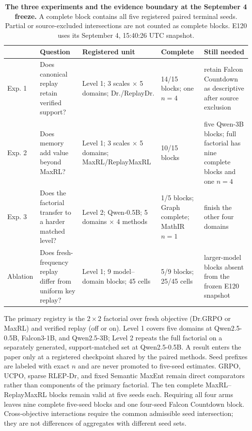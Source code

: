 \begin{table}[H]
  \centering
  \caption{\textbf{The three experiments and the evidence boundary at the
  September 4 freeze.} A complete block contains all five registered paired
  terminal seeds. Partial or source-excluded intersections are not counted as complete blocks.
  E120 uses its September 4, 15:40:26 UTC snapshot.}
  \label{tab:experiment-map}
  \scriptsize
  \setlength{\tabcolsep}{3pt}
  \begin{tabularx}{\linewidth}{@{}P{.09\linewidth}P{.27\linewidth}P{.25\linewidth}P{.15\linewidth}Y@{}}
    \toprule
    & \textbf{Question} & \textbf{Registered unit} & \textbf{Complete} &
      \textbf{Still needed} \\
    \midrule
    Exp. 1 & Does canonical replay retain verified support? &
      Level 1; 3 scales $\times$ 5 domains; Dr./ReplayDr. &
      14/15 blocks; one $n=4$ & retain Falcon Countdown as descriptive after source exclusion \\
    Exp. 2 & Does memory add value beyond MaxRL? &
      Level 1; 3 scales $\times$ 5 domains; MaxRL/ReplayMaxRL &
      10/15 blocks & five Qwen-3B blocks; full factorial has nine complete blocks and one $n=4$ \\
    Exp. 3 & Does the factorial transfer to a harder matched level? &
      Level 2; Qwen-0.5B; 5 domains $\times$ 4 methods &
      1/5 blocks; Graph complete; MathIR \(n=1\) & finish the other four domains \\
    Ablation & Does fresh-frequency replay differ from uniform key replay? &
      Level 1; 9 model--domain blocks; 45 cells &
      5/9 blocks; 25/45 cells & larger-model blocks absent from the frozen E120 snapshot \\
    \bottomrule
  \end{tabularx}
\end{table}


The primary registry is the $2\times2$ factorial over fresh objective
(Dr.GRPO or MaxRL) and verified replay (off or on). Level 1 covers five domains
at Qwen2.5-0.5B, Falcon3-1B, and Qwen2.5-3B; Level 2 repeats the full factorial
on a separately generated, support-matched set at Qwen2.5-0.5B. A result enters
the paper only at a registered checkpoint shared by the paired methods. Seed
prefixes are labeled with exact $n$ and are never promoted to five-seed
estimates. GRPO, UCPO, sparse RLEP-Dr, and fixed Semantic MaxEnt remain direct
comparators rather than components of the primary factorial. The ten complete
MaxRL--ReplayMaxRL blocks remain valid at five seeds each. Requiring all four
arms leaves nine complete five-seed blocks and one four-seed Falcon Countdown
block. Cross-objective interactions require the common admissible seed
intersection; they are not differences of aggregates with different seed sets.

